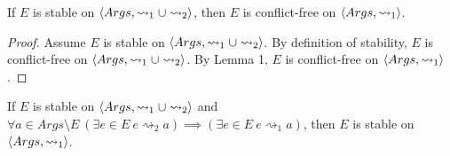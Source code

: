 \begin{lemma}
	If $E$ is stable on $\langle{Args},{\rightsquigarrow_1\cup\rightsquigarrow_2}\rangle$, then $E$ is conflict-free on $\langle{Args},{\rightsquigarrow_1}\rangle$.
	
	\begin{proof}
		Assume $E$ is stable on $\langle{Args},{\rightsquigarrow_1\cup\rightsquigarrow_2}\rangle$. By definition of stability, $E$ is conflict-free on $\langle{Args},{\rightsquigarrow_1\cup\rightsquigarrow_2}\rangle$.  By Lemma 1, $E$ is conflict-free on $\langle{Args},{\rightsquigarrow_1}\rangle$.
	\end{proof}
\end{lemma}

\begin{lemma}
	If $E$ is stable on $\langle{Args},{\rightsquigarrow_1\cup\rightsquigarrow_2}\rangle$ and $\forall a\in Args\setminus E\ (\exists e\in E\ e\rightsquigarrow_2 a)\implies(\exists e\in E\ e\rightsquigarrow_1 a)$, then $E$ is stable on $\langle{Args},{\rightsquigarrow_1}\rangle$.
	

\end{lemma}

